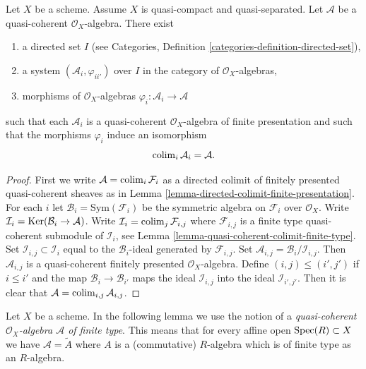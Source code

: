 \begin{lemma}
\label{lemma-algebra-directed-colimit-finite-presentation}
Let $X$ be a scheme. Assume $X$ is quasi-compact and quasi-separated.
Let $\mathcal{A}$ be a quasi-coherent $\mathcal{O}_X$-algebra.
There exist
\begin{enumerate}
\item a directed set $I$ (see
Categories, Definition \ref{categories-definition-directed-set}),
\item a system $(\mathcal{A}_i, \varphi_{ii'})$
over $I$ in the category of $\mathcal{O}_X$-algebras,
\item morphisms of $\mathcal{O}_X$-algebras
$\varphi_i : \mathcal{A}_i \to \mathcal{A}$
\end{enumerate}
such that each $\mathcal{A}_i$ is a quasi-coherent $\mathcal{O}_X$-algebra
of finite presentation and such that the morphisms $\varphi_i$
induce an isomorphism
$$
\mathop{\mathrm{colim}}\nolimits_i \mathcal{A}_i
=
\mathcal{A}.
$$
\end{lemma}

\begin{proof}
First we write $\mathcal{A} = \mathop{\mathrm{colim}}\nolimits_i \mathcal{F}_i$ as a directed
colimit of finitely presented quasi-coherent sheaves as in
Lemma \ref{lemma-directed-colimit-finite-presentation}.
For each $i$ let $\mathcal{B}_i = \text{Sym}(\mathcal{F}_i)$ be the
symmetric algebra on $\mathcal{F}_i$ over $\mathcal{O}_X$. Write
$\mathcal{I}_i = \mathop{\mathrm{Ker}}(\mathcal{B}_i \to \mathcal{A})$. Write
$\mathcal{I}_i = \mathop{\mathrm{colim}}\nolimits_j \mathcal{F}_{i, j}$ where
$\mathcal{F}_{i, j}$ is a finite type quasi-coherent submodule of
$\mathcal{I}_i$, see
Lemma \ref{lemma-quasi-coherent-colimit-finite-type}.
Set $\mathcal{I}_{i, j} \subset \mathcal{I}_i$
equal to the $\mathcal{B}_i$-ideal generated by $\mathcal{F}_{i, j}$.
Set $\mathcal{A}_{i, j} = \mathcal{B}_i/\mathcal{I}_{i, j}$.
Then $\mathcal{A}_{i, j}$ is a quasi-coherent finitely presented
$\mathcal{O}_X$-algebra. Define $(i, j) \leq (i', j')$ if
$i \leq i'$ and the map $\mathcal{B}_i \to \mathcal{B}_{i'}$
maps the ideal $\mathcal{I}_{i, j}$ into the ideal $\mathcal{I}_{i', j'}$.
Then it is clear that $\mathcal{A} = \mathop{\mathrm{colim}}\nolimits_{i, j} \mathcal{A}_{i, j}$.
\end{proof}

\noindent
Let $X$ be a scheme. In the following lemma we use the notion
of a {\it quasi-coherent $\mathcal{O}_X$-algebra $\mathcal{A}$
of finite type}. This means that for every affine open
$\mathop{\mathrm{Spec}}(R) \subset X$ we have $\mathcal{A} = \widetilde{A}$
where $A$ is a (commutative) $R$-algebra which is of finite type
as an $R$-algebra.

